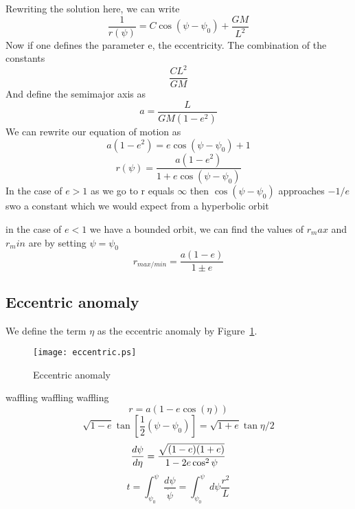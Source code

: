 Rewriting the solution here, we can write
\begin{equation}
\frac{1}{r(\psi)} = C \cos(\psi - \psi_0) + \frac{GM}{L^2}
\end{equation}
Now if one defines the parameter e, the eccentricity. The combination of the constants
\begin{equation}
\frac{CL^2}{GM}
\end{equation}
And define the semimajor axis as
\begin{equation}
a = \frac{L}{GM(1-e^2)}
\end{equation} 
We can rewrite our equation of motion as
\begin{equation}
a(1 - e^2) = e \cos(\psi - \psi_0) + 1
\end{equation}
\begin{equation}
r(\psi) = \frac{a(1-e^2)}{1 + e\cos(\psi - \psi_0)}
\end{equation}
In the case of $e>1$ as we go to r equals $\infty$ then $\cos(\psi - \psi_0)$ approaches $-1/e$ swo a constant which we would expect from a hyperbolic orbit

in the case of $e<1$ we have a bounded orbit, we can find the values of $r_max$ and $r_min$ are by setting $\psi=\psi_0$
\begin{equation}
r_{max/min} = \frac{a(1-e)}{1\pm e}
\end{equation}


\subsection{Eccentric anomaly}
We define the term $\eta$ as the eccentric anomaly by Figure~\ref{ecc}.
\begin{figure}
\centering
\texttt{[image: eccentric.ps]}
\caption{Eccentric anomaly \label{ecc}}
\end{figure}
waffling waffling waffling
\begin{equation}
r = a(1 - e\cos(\eta))
\end{equation}
\begin{equation}
\sqrt{1-e} \tan [\frac{1}{2} (\psi-\psi_0)] = \sqrt{1+e} \tan{\eta/2}
\end{equation}
\begin{equation}
\frac{d \psi}{d \eta} = \frac{\sqrt{(1-e)(1+e)}}{ 1 - 2e\cos^2\psi}
\end{equation}
\begin{equation}
t = \int_{\psi_0}^{\psi} \frac{d\psi}{\dot{\psi}} = \int_{\psi_0}^{\psi} d\psi \frac{r^2}{L}
\end{equation}

